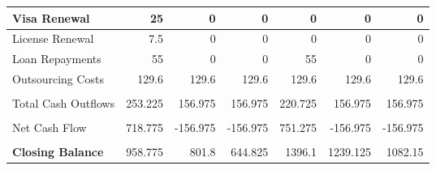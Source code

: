 \begin{table}[H]
\begin{tabular}{|l|r|r|r|r|r|r|}
    \midrule
    Visa Renewal & 25    & 0     & 0     & 0     & 0     & 0 \\
    \midrule
    License Renewal & 7.5   & 0     & 0     & 0     & 0     & 0 \\
    \midrule
    Loan Repayments & 55    & 0     & 0     & 55    & 0     & 0 \\
    \midrule
    Outsourcing Costs & 129.6 & 129.6 & 129.6 & 129.6 & 129.6 & 129.6 \\
    \midrule
          &       &       &       &       &       &  \\
    \midrule
    Total Cash Outflows & 253.225 & 156.975 & 156.975 & 220.725 & 156.975 & 156.975 \\
    \midrule
          &       &       &       &       &       &  \\
    \midrule
    Net Cash Flow & 718.775 & -156.975 & -156.975 & 751.275 & -156.975 & -156.975 \\
    \midrule
          &       &       &       &       &       &  \\
    \midrule
    \textbf{Closing Balance} & 958.775 & 801.8 & 644.825 & 1396.1 & 1239.125 & 1082.15 \\
    \bottomrule
    \hline
    \hline
    \end{tabular}%
  \label{tab:addlabel}%
\end{table}%

